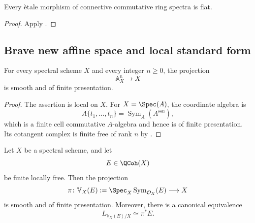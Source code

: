 \begin{corollary}
\label{cor:etale-flat}
Every \`etale morphism of connective commutative ring spectra is flat.
\end{corollary}

\begin{proof}
Apply .
\end{proof}

\subsection{Brave new affine space and local standard form}

\begin{proposition}
\label{prop:brave-new-affine-space-smooth}
For every spectral scheme $X$ and every integer $n\geq0$, the projection
\[
    \mathbb A_X^n
    \longrightarrow
    X
\]
is smooth and of finite presentation.
\end{proposition}

\begin{proof}
The assertion is local on $X$. For $X=\Spec(A)$, the coordinate algebra is
\[
    A\{t_1,\ldots,t_n\}
    =
    \operatorname{Sym}_A(A^{\oplus n}),
\]
which is a finite cell commutative $A$-algebra and hence is of finite
presentation. Its cotangent complex is finite free of rank $n$ by
.
\end{proof}

\begin{proposition}
\label{prop:relative-vector-space-smooth}
Let \(X\) be a spectral scheme, and let
\[
    E
    \in
    \QCoh(X)
\]
be finite locally free. Then the projection
\[
    \pi
    \colon
    \mathbb V_X(E)
    :=
    \Spec_X
    \operatorname{Sym}_{\mathcal O_X}(E)
    \longrightarrow
    X
\]
is smooth and of finite presentation. Moreover, there is a canonical
equivalence
\[
    L_{\mathbb V_X(E)/X}
    \simeq
    \pi^*E.
\]
\end{proposition}

